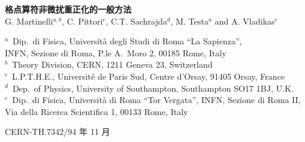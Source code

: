 \documentclass[11pt]{ctexart}
\begin{document}
\begin{center}
{\LARGE\bfseries 格点算符非微扰重正化的一般方法\footnotemark}\\[1.8em]
{\large G. Martinelli$^{a,b}$, C. Pittori$^{c}$,
C.T. Sachrajda$^{d}$, M. Testa$^{a}$ and A. Vladikas$^{e}$}\\[1.2em]
{\small
$^{a}$~Dip.\ di Fisica, Universit\`a degli Studi di Roma ``La Sapienza'',\\
INFN, Sezione di Roma, P.le A.\ Moro 2, 00185 Rome, Italy\\[3pt]
$^{b}$~Theory Division, CERN, 1211 Geneva 23, Switzerland\\[3pt]
$^{c}$~L.P.T.H.E., Universit\'e de Paris Sud, Centre d'Orsay, 91405 Orsay, France\\[3pt]
$^{d}$~Dep.\ of Physics, University of Southampton, Southampton SO17 1BJ, U.K.\\[3pt]
$^{e}$~Dip.\ di Fisica, Universit\`a di Roma ``Tor Vergata'', INFN, Sezione di Roma II,\\
Via della Ricerca Scientifica 1, 00133 Rome, Italy\par}
\end{center}
\begingroup\let\thefootnote\relax{}\endgroup

\begin{abstract}
我们提出一种非微扰方法，用于计算一般复合算符的重正化常数。该方法旨在减小某些系统误差，
这些误差在人们试图从格点算符的矩阵元得到物理预言时是存在的。我们还给出了若干两费米子
算符重正化常数的计算结果，这些结果是用我们的方法、通过 $QCD$ 的数值模拟、在
$\beta=6.0$ 的 $16^3 \times 32$ 格点上得到的。模拟结果令人鼓舞，并建议进一步应用于
四费米子算符和重夸克有效理论。
\end{abstract}

\vspace{1em}
\noindent CERN-TH.7342/94  年 11 月









\end{document}
